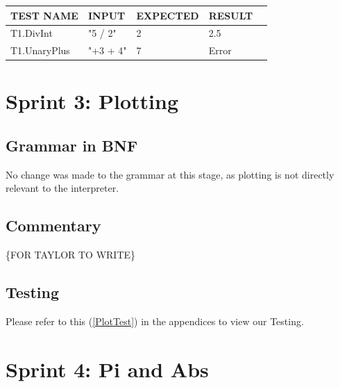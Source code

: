 \documentclass[a4paper, oneside, 11pt]{report}
\begin{document}
    \begin{center}
        \begin{tabular}{|p{1.5in}|p{1.5in}|p{1.6in}|p{1.6in}|p{2.4in}|}
            \hline
            TEST NAME & INPUT & EXPECTED & RESULT \\
            \hline
            T1.DivInt & "5 / 2" & 2 & 2.5 \\
            \hline
            T1.UnaryPlus & "+3 + 4" & 7 & Error \\
            \hline
        \end{tabular}
    \end{center}


    \clearpage
    \section{Sprint 3: Plotting}
    \subsection{Grammar in BNF}
    No change was made to the grammar at this stage, as plotting is not directly relevant to the interpreter.

    \subsection{Commentary}
    \{FOR TAYLOR TO WRITE\}

    \subsection{Testing}
    Please refer to this (\ref{PlotTest}) in the appendices to view our Testing. \\

    \clearpage

    \section{Sprint 4: Pi and Abs}
\end{document}
